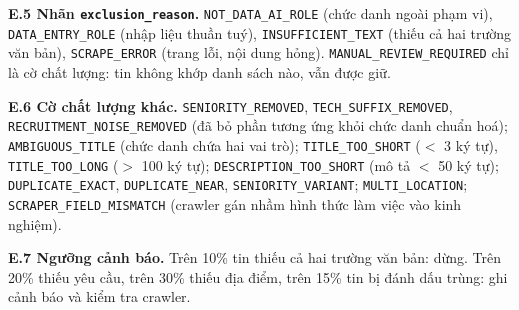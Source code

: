 \documentclass[12pt]{article}
\newcommand{\code}[1]{\texttt{#1}}
\begin{document}
\textbf{E.5 Nhãn \code{exclusion\_reason}.} \code{NOT\_DATA\_AI\_ROLE} (chức danh ngoài phạm vi), \code{DATA\_ENTRY\_ROLE} (nhập liệu thuần tuý), \code{INSUFFICIENT\_TEXT} (thiếu cả hai trường văn bản), \code{SCRAPE\_ERROR} (trang lỗi, nội dung hỏng). \code{MANUAL\_REVIEW\_REQUIRED} chỉ là cờ chất lượng: tin không khớp danh sách nào, vẫn được giữ.

\textbf{E.6 Cờ chất lượng khác.} \code{SENIORITY\_REMOVED}, \code{TECH\_SUFFIX\_REMOVED}, \code{RECRUITMENT\_NOISE\_REMOVED} (đã bỏ phần tương ứng khỏi chức danh chuẩn hoá); \code{AMBIGUOUS\_TITLE} (chức danh chứa hai vai trò); \code{TITLE\_TOO\_SHORT} ($<$ 3 ký tự), \code{TITLE\_TOO\_LONG} ($>$ 100 ký tự); \code{DESCRIPTION\_TOO\_SHORT} (mô tả $<$ 50 ký tự); \code{DUPLICATE\_EXACT}, \code{DUPLICATE\_NEAR}, \code{SENIORITY\_VARIANT}; \code{MULTI\_LOCATION}; \code{SCRAPER\_FIELD\_MISMATCH} (crawler gán nhầm hình thức làm việc vào kinh nghiệm).

\textbf{E.7 Ngưỡng cảnh báo.} Trên 10\% tin thiếu cả hai trường văn bản: dừng. Trên 20\% thiếu yêu cầu, trên 30\% thiếu địa điểm, trên 15\% tin bị đánh dấu trùng: ghi cảnh báo và kiểm tra crawler.

\clearpage
{}
{}
\end{document}
